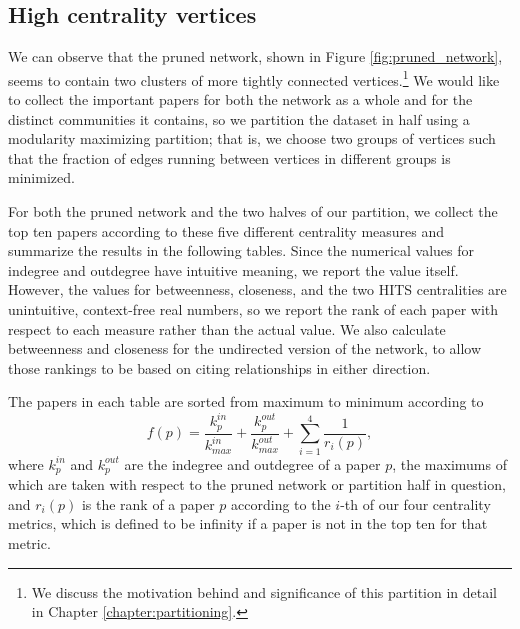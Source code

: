 \documentclass[12pt]{thesis}
\theoremstyle{plain}
\theoremstyle{definition}
\theoremstyle{remark}
\begin{document}
\subsection{High centrality vertices}\label{section:high_centrality_vertices}

We can observe that the pruned network, shown in Figure \ref{fig:pruned_network}, seems to contain two clusters of more tightly connected vertices.\footnote{We discuss the motivation behind and significance of this partition in detail in Chapter \ref{chapter:partitioning}.} We would like to collect the important papers for both the network as a whole and for the distinct communities it contains, so we partition the dataset in half using a modularity maximizing partition; that is, we choose two groups of vertices such that the fraction of edges running between vertices in different groups is minimized.

For both the pruned network and the two halves of our partition, we collect the top ten papers according to these five different centrality measures and summarize the results in the following tables. Since the numerical values for indegree and outdegree have intuitive meaning, we report the value itself. However, the values for betweenness, closeness, and the two HITS centralities are unintuitive, context-free real numbers, so we report the rank of each paper with respect to each measure rather than the actual value. We also calculate betweenness and closeness for the undirected version of the network, to allow those rankings to be based on citing relationships in either direction.

The papers in each table are sorted from maximum to minimum according to \[ f(p) = \frac{k^{in}_p}{k^{in}_{max}} + \frac{k^{out}_p}{ k^{out}_{max}} + \sum_{i=1}^4 \frac{1}{r_i(p)}, \] where $k^{in}_p$ and $k^{out}_p$ are the indegree and outdegree of a paper $p$, the maximums of which are taken with respect to the pruned network or partition half in question, and $r_i(p)$ is the rank of a paper $p$ according to the $i$-th of our four centrality metrics, which is defined to be infinity if a paper is not in the top ten for that metric.
 
\end{document}
